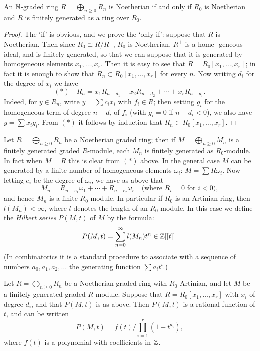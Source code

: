 \begin{theorem}\label{thm:13.1}
An $\mathbb{N}$-graded ring $R = \bigoplus_{n \ge 0} R_n$ is Noetherian if and only if
$R_0$ is Noetherian and $R$ is finitely generated as a ring over $R_0$.
\end{theorem}

\begin{proof}
The `if' is obvious, and we prove the `only if': suppose that $R$
is Noetherian. Then since $R_0 \cong R/R^+$, $R_0$ is Noetherian. $R^+$ is a home-
geneous ideal, and is finitely generated, so that we can suppose that it is
generated by homogeneous elements $x_1, \ldots, x_r$. Then it is easy to see that
$R = R_0[x_1, \ldots, x_r]$; in fact it is enough to show that $R_n \subset R_0[x_1, \ldots, x_r]$
for every $n$. Now writing $d_i$ for the degree of $x_i$ we have
\[
  (*) \quad R_n = x_1R_{n-d_1} + x_2R_{n-d_2} + \cdots + x_rR_{n-d_r}.
\]
Indeed, for $y \in R_n$, write $y = \sum c_ix_i$ with $f_i \in R$; then setting $g_i$ for the
homogeneous term of degree $n - d_i$ of $f_i$ (with $g_i = 0$ if $n - d_i < 0$), we also
have $y = \sum x_ig_i$. From $(*)$ it follows by induction that $R_n \subset R_0[x_1, \ldots, x_r]$.
\end{proof}

Let $R = \bigoplus_{n \ge 0} R_n$ be a Noetherian graded ring; then if $M = \bigoplus_{n \ge 0} M_n$
is a finitely generated graded $R$-module, each $M_n$ is finitely generated
as $R_0$-module. In fact when $M = R$ this is clear from $(*)$ above. In the general
case $M$ can be generated by a finite number of homogeneous elements $\omega_i$: $M
= \sum R\omega_i$. Now letting $e_i$ be the degree of $\omega_i$, we have as above that
\[
  M_n = R_{n-e_1}\omega_1 + \cdots + R_{n-e_r}\omega_r \quad \text{(where } R_i = 0 \text{ for } i < 0),
\]
and hence $M_n$ is a finite $R_0$-module. In particular if $R_0$ is an Artinian ring,
then $l(M_n) < \infty$, where $l$ denotes the length of an $R_0$-module. In this case we
define the \emph{Hilbert series} $P(M, t)$ of $M$ by the formula:
\[
  P(M, t) = \sum_{n=0}^{\infty} l(M_n)t^n \in \mathbb{Z}[[t]].
\]
(In combinatorics it is a standard procedure to associate with a sequence of
numbers $a_0, a_1, a_2, \ldots$ the generating function $\sum a_it^i$.)

\begin{theorem}\label{thm:13.2}
Let $R = \bigoplus_{n \ge 0} R_n$ be a Noetherian graded ring with $R_0$
Artinian, and let $M$ be a finitely generated graded $R$-module. Suppose that
$R = R_0[x_1, \ldots, x_r]$ with $x_i$ of degree $d_i$, and that $P(M, t)$ is as above. Then
$P(M, t)$ is a rational function of $t$, and can be written
\[
  P(M, t) = f(t) \Big/ \prod_{i=1}^{r} (1 - t^{d_i}),
\]
where $f(t)$ is a polynomial with coefficients in $\mathbb{Z}$.
\end{theorem}


